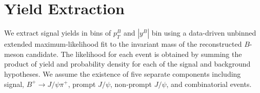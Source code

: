 \section{Yield Extraction}
\label{sec:yieldextraction}


We extract signal yields in bins of $p_T^B$ and $|y^B|$ bin using a data-driven unbinned extended maximum-likelihood fit to the invariant mass of 
the reconstructed $B$-meson candidate. The likelihood for each event is obtained by summing the product of yield and probability density for each of the signal and background hypotheses. We assume the existence of five separate components including signal, $B^+\to J/\psi \pi^+$, prompt $J/\psi$, non-prompt  $J/\psi$, and combinatorial events. 

